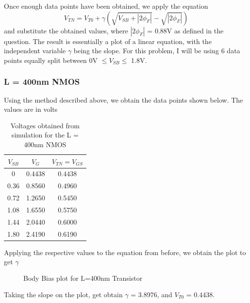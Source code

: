 \documentclass[12pt]{article}
\begin{document}
Once enough data points have been obtained, we apply the equation
\[V_{TN} = V_{T0} + \gamma (\sqrt{V_{SB} + |2\phi_F|} - \sqrt{|2\phi_F|}) \]
and substitute the obtained values, where $|2\phi_F|$ = 0.88V as defined in the question. The result is essentially a plot of a linear equation, with the independent
variable $\gamma$ being the slope. For this problem, I will be using 6 data points equally split between 0V $\leq V_{SB} \leq$ 1.8V.
\subsubsection{L = 400nm NMOS}
Using the method described above, we obtain the data points shown below. The values are in volts
\begin{table} [H]
    \centering
    \begin{tabular} {ccc}
        $V_{SB}$ & $V_{G}$ & $V_{TN} = V_{GS}$\\
        \hline
        0 & 0.4438 & 0.4438\\
        0.36 & 0.8560 & 0.4960\\
        0.72 & 1.2650 & 0.5450\\
        1.08 & 1.6550 & 0.5750\\
        1.44 & 2.0440 & 0.6000\\
        1.80 & 2.4190 & 0.6190\\
    \end{tabular}
    \caption{Voltages obtained from simulation for the L = 400nm NMOS}
\end{table}
Applying the respective values to the equation from before, we obtain the plot to get $\gamma$
\begin{figure} [H]
    \centering
    \caption{Body Bias plot for L=400nm Transistor}
\end{figure}
Taking the slope on the plot, get obtain $\gamma$ = 3.8976, and $V_{T0}$ = 0.4438.
\end{document}
